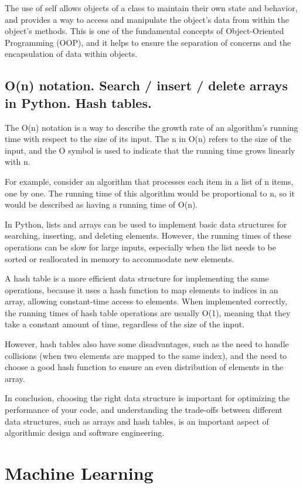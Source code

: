 \documentclass[12pt, a4paper, oneside]{article}
\begin{document}
The use of self allows objects of a class to maintain their own state and behavior, and provides a way to access and manipulate the object's data from within the object's methods. This is one of the fundamental concepts of Object-Oriented Programming (OOP), and it helps to ensure the separation of concerns and the encapsulation of data within objects.

\subsection{ O(n) notation. Search / insert / delete arrays in Python. Hash tables.   }
The O(n) notation is a way to describe the growth rate of an algorithm's running time with respect to the size of its input. The n in O(n) refers to the size of the input, and the O symbol is used to indicate that the running time grows linearly with n.

For example, consider an algorithm that processes each item in a list of n items, one by one. The running time of this algorithm would be proportional to n, so it would be described as having a running time of O(n).

In Python, lists and arrays can be used to implement basic data structures for searching, inserting, and deleting elements. However, the running times of these operations can be slow for large inputs, especially when the list needs to be sorted or reallocated in memory to accommodate new elements.

A hash table is a more efficient data structure for implementing the same operations, because it uses a hash function to map elements to indices in an array, allowing constant-time access to elements. When implemented correctly, the running times of hash table operations are usually O(1), meaning that they take a constant amount of time, regardless of the size of the input.

However, hash tables also have some disadvantages, such as the need to handle collisions (when two elements are mapped to the same index), and the need to choose a good hash function to ensure an even distribution of elements in the array.

In conclusion, choosing the right data structure is important for optimizing the performance of your code, and understanding the trade-offs between different data structures, such as arrays and hash tables, is an important aspect of algorithmic design and software engineering.

\section{Machine Learning}
\end{document}

